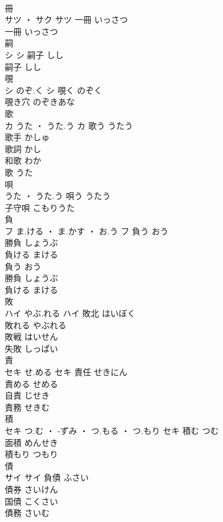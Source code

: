 \documentclass[8pt]{extreport}
\begin{document}
\begin{CJK}{UTF8}{min}
\\	冊	
\\	サツ ・ サク		サツ	一冊	いっさつ	
\\	一冊	いっさつ	
\\	嗣	
\\	シ		シ	嗣子	しし	
\\	嗣子	しし	
\\	覗	
\\	シ	のぞ.く	シ	覗く	のぞく	
\\	覗き穴	のぞきあな	
\\	歌	
\\	カ	うた ・ うた.う	カ	歌う	うたう	
\\	歌手	かしゅ	
\\	歌詞	かし	
\\	和歌	わか	
\\	歌	うた	
\\	唄	
\\	うた ・ うた.う		唄う	うたう	
\\	子守唄	こもりうた	
\\	負	
\\	フ	ま.ける ・ ま.かす ・ お.う	フ	負う	おう	
\\	勝負	しょうぶ	
\\	負ける	まける	
\\	負う	おう	
\\	勝負	しょうぶ	
\\	負ける	まける	
\\	敗	
\\	ハイ	やぶ.れる	ハイ	敗北	はいぼく	
\\	敗れる	やぶれる	
\\	敗戦	はいせん	
\\	失敗	しっぱい	
\\	責	
\\	セキ	せ.める	セキ	責任	せきにん	
\\	責める	せめる	
\\	自責	じせき	
\\	責務	せきむ	
\\	積	
\\	セキ	つ.む ・ -ずみ ・ つ.もる ・ つ.もり	セキ	積む	つむ	
\\	面積	めんせき	
\\	積もり	つもり	
\\	債	
\\	サイ		サイ	負債	ふさい	
\\	債券	さいけん	
\\	国債	こくさい	
\\	債務	さいむ	

\end{CJK}
\end{document}
